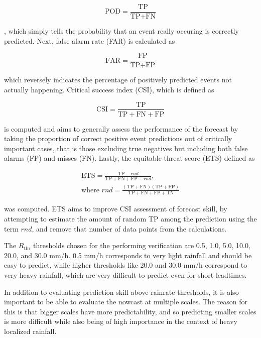 \begin{equation}
	\text{POD} = \frac{\text{TP}}{\text{TP}+\text{FN}}
\end{equation} 

, which simply tells the probability that an event really occuring is correctly predicted. Next, false alarm rate (FAR) is calculated as 

\begin{equation}
	\text{FAR} = \frac{\text{FP}}{\text{TP}+\text{FP}}
\end{equation}

which reversely indicates the percentage of positively predicted events not actually happening. Critical success index (CSI), which is defined as 

\begin{equation}
	\text{CSI} = \frac{\text{TP}}{\text{TP}+\text{FN}+\text{FP}}
\end{equation}

is computed and aims to generally assess the performance of the forecast by taking the proportion of correct positive event predictions out of critically important cases, that is those excluding true negatives but including both false alarms (FP) and misses (FN). Lastly, the equitable threat score (ETS) defined as  

\begin{equation}
\begin{split}
\text{ETS} = \frac{\text{TP} - rnd}{\text{TP}+\text{FN}+\text{FP}- rnd}, \\
\text{where } rnd = \frac{(\text{TP}+\text{FN})(\text{TP}+\text{FP})}{\text{TP}+\text{FN}+\text{FP}+\text{TN}}
\end{split}
\end{equation}

was computed. ETS aims to improve CSI assessment of forecast skill, by attempting to estimate the amount of random TP among the prediction using the term $rnd$, and remove that number of data points from the calculations.

The $R_{\text{thr}}$ thresholds chosen for the performing verification are 0.5, 1.0, 5.0, 10.0, 20.0, and 30.0 mm/h. 0.5 mm/h corresponds to very light rainfall and should be easy to predict, while higher thresholds like 20.0 and 30.0 mm/h correspond to very heavy rainfall, which are very difficult to predict even for short leadtimes.

In addition to evaluating prediction skill above rainrate thresholds, it is also important to be able to evaluate the nowcast at multiple scales. The reason for this is that bigger scales have more predictability, and so predicting smaller scales is more difficult while also being of high importance in the context of heavy localized rainfall. 

